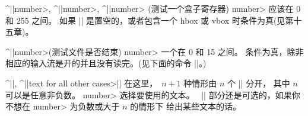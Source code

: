 {{{{{{{{%
\medbreak
\item\bull^|\ifvoid|\<number>, ^|\ifhbox|\<number>, ^|\ifvbox|\<number>\quad
(测试一个盒子寄存器)
\nobreak\smallskip\noindent
\<number> 应该在 0 和 255 之间。%
如果 |\box| 是置空的，或者包含一个 hbox 或 vbox 时条件为真(见第十五章)。

\medbreak
\item\bull^|\ifeof|\<number>\quad(测试文件是否结束)
\nobreak\smallskip\noindent
\<number> 一个在 0 和 15 之间。%
条件为真，除非相应的输入流是开的并且没有读完。(见下面的命令 |\openin|。)

\medbreak
\item\bull^|\iftrue|, ^|\iffalse|\quad(永远为真或为假)
\nobreak\smallskip\noindent
这些条件有预先确定的结果。%
但是它们却非常有用，见下面的讨论。

\medbreak
最后，有一个多条件结构，它与其它的不同，因为它有多个分支：
\begindisplay
\llap{\bull\enspace}^|\ifcase|\<number>\<text for case 0>|\or|\<text
  for case 1>|\or|$\;\cdots$\cr
|         \or|\<text for case $n$>|\else|\<text for all other cases>|\fi|\cr
\enddisplay
在这里，~$n+1$ 种情形由 $n$ 个 |\or| 分开，
其中 $n$ 可以是任意非负数。%
\<number> 选择要使用的文本。%
~|\else| 部分还是可选的，如果你不想在 \<number> 为负数或大于 $n$ 的情形下%
给出某些文本的话。

}}}}}}}}
